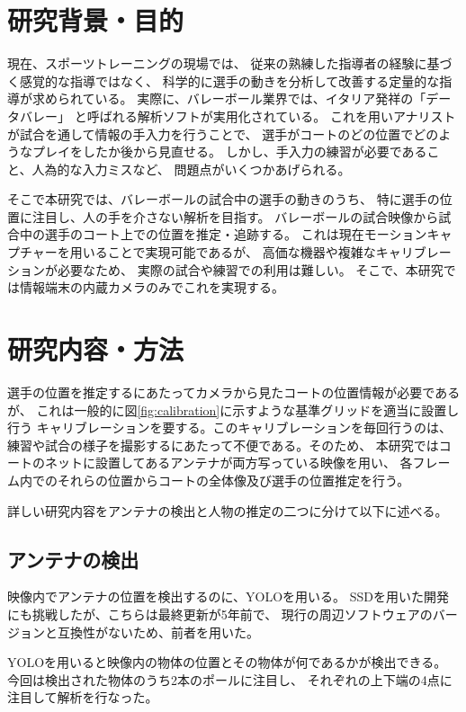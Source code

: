 \documentclass[twoside,twocolumn]{jsarticle}
\begin{document}
\maketitle
\section{研究背景・目的}
	現在、スポーツトレーニングの現場では、
	従来の熟練した指導者の経験に基づく感覚的な指導ではなく、
	科学的に選手の動きを分析して改善する定量的な指導が求められている。
	実際に、バレーボール業界では、イタリア発祥の「データバレー」
	と呼ばれる解析ソフトが実用化されている。
	これを用いアナリストが試合を通して情報の手入力を行うことで、
	選手がコートのどの位置でどのようなプレイをしたか後から見直せる。
	しかし、手入力の練習が必要であること、人為的な入力ミスなど、
	問題点がいくつかあげられる。

	そこで本研究では、バレーボールの試合中の選手の動きのうち、
	特に選手の位置に注目し、人の手を介さない解析を目指す。
	バレーボールの試合映像から試合中の選手のコート上での位置を推定・追跡する。 
	これは現在モーションキャプチャーを用いることで実現可能であるが、
	高価な機器や複雑なキャリブレーションが必要なため、
	実際の試合や練習での利用は難しい。
	そこで、本研究では情報端末の内蔵カメラのみでこれを実現する。 
\section{研究内容・方法}
	選手の位置を推定するにあたってカメラから見たコートの位置情報が必要であるが、
	これは一般的に図\ref{fig:calibration}に示すような基準グリッドを適当に設置し行う
	キャリブレーションを要する。このキャリブレーションを毎回行うのは、
	練習や試合の様子を撮影するにあたって不便である。そのため、
	本研究ではコートのネットに設置してあるアンテナが両方写っている映像を用い、
	各フレーム内でのそれらの位置からコートの全体像及び選手の位置推定を行う。 

	詳しい研究内容をアンテナの検出と人物の推定の二つに分けて以下に述べる。 

	\subsection{アンテナの検出}
		映像内でアンテナの位置を検出するのに、YOLO\cite{Redmon}を用いる。
		SSD\cite{Liu}を用いた開発にも挑戦したが、こちらは最終更新が5年前で、
		現行の周辺ソフトウェアのバージョンと互換性がないため、前者を用いた。

		YOLOを用いると映像内の物体の位置とその物体が何であるかが検出できる。
		今回は検出された物体のうち2本のポールに注目し、
		それぞれの上下端の4点に注目して解析を行なった。
\end{document}
